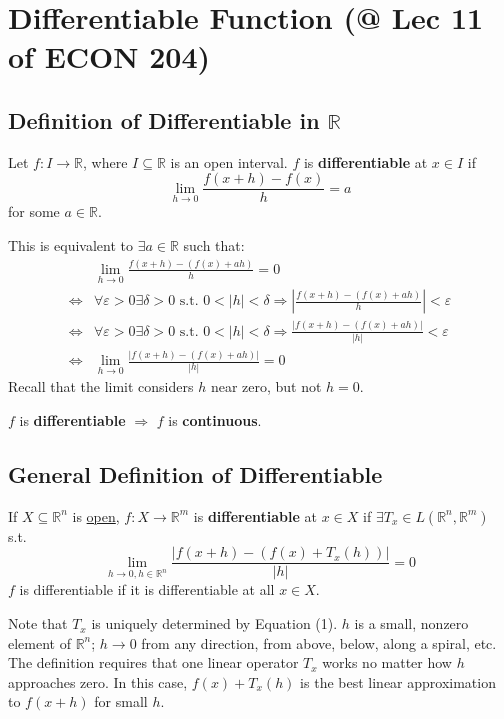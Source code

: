 \documentclass[11pt]{elegantbook}
\begin{document}
\section{Differentiable Function \small{(@ Lec 11 of ECON 204)}}
\subsection{Definition of Differentiable in $\mathbb{R}$}
\begin{definition}
    \normalfont
    Let $f: I \rightarrow \mathbb{R}$, where $I \subseteq \mathbb{R}$ is an open interval. $f$ is \textbf{differentiable} at $x \in I$ if
    $$
    \lim _{h \rightarrow 0} \frac{f(x+h)-f(x)}{h}=a
    $$
    for some $a \in \mathbb{R}$.
\end{definition}
This is equivalent to $\exists a \in \mathbb{R}$ such that:
$$
\begin{aligned}
& \lim _{h \rightarrow 0} \frac{f(x+h)-(f(x)+a h)}{h}=0 \\
\Leftrightarrow & \forall \varepsilon>0 \exists \delta>0 \text { s.t. } 0<|h|<\delta \Rightarrow\left|\frac{f(x+h)-(f(x)+a h)}{h}\right|<\varepsilon \\
\Leftrightarrow & \forall \varepsilon>0 \exists \delta>0 \text { s.t. } 0<|h|<\delta \Rightarrow \frac{|f(x+h)-(f(x)+a h)|}{|h|}<\varepsilon \\
\Leftrightarrow & \lim _{h \rightarrow 0} \frac{|f(x+h)-(f(x)+a h)|}{|h|}=0
\end{aligned}
$$
Recall that the limit considers $h$ near zero, but not $h=0$.

\begin{proposition}
    $f$ is \textbf{differentiable} $\Rightarrow$ $f$ is \textbf{continuous}.
\end{proposition}

\subsection{General Definition of Differentiable}
\begin{definition}
    \normalfont
    If $X \subseteq \mathbb{R}^n$ is \underline{open}, $f : X \rightarrow \mathbb{R}^m$ is \textbf{differentiable} at $x \in X$ if $\exists T_x\in L(\mathbb{R}^n,\mathbb{R}^m)$ s.t. $$\lim_{h \rightarrow 0, h\in \mathbb{R}^n}\frac{|f(x+h)-(f(x)+T_x(h))|}{|h|}=0$$
    $f$ is differentiable if it is differentiable at all $x \in X$.
\end{definition}
Note that $T_x$ is uniquely determined by Equation (1). $h$ is a small, nonzero element of $\mathbb{R}^n$; $h \rightarrow 0$ from any direction, from above, below, along a spiral, etc. The definition requires that one linear operator $T_x$ works no matter how $h$ approaches zero. In this case, $f(x) + T_x(h)$ is the best linear approximation to $f(x + h)$ for small $h$.
\end{document}
